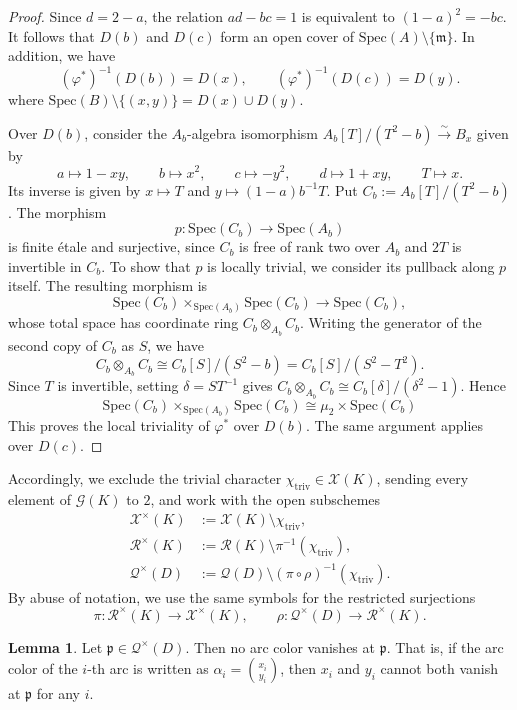 \documentclass[12pt,reqno]{amsart}
\newcommand{\calQ}{\mathcal{Q}}
\newcommand{\calX}{\mathcal{X}}
\newcommand{\calG}{\mathcal{G}}
\newcommand{\calR}{\mathcal{R}}
\newcommand{\Spec}{\mathrm{Spec}}
\theoremstyle{definition}
\newtheorem{lemma}[theorem]{Lemma}
\begin{document}
	\begin{proof}
		Since $d=2-a$, the relation $ad-bc=1$ is equivalent to $(1-a)^2=-bc$.
		It follows that $D(b)$ and $D(c)$ form an open cover of $\mathrm{Spec}(A)\setminus \{ \mathfrak{m}\}$. In addition, we have
		\[
    		(\varphi^\ast)^{-1}(D(b))=D(x),	\qquad 	(\varphi^\ast)^{-1}(D(c))=D(y).
		\]
		where $\mathrm{Spec}(B)\setminus\{(x,y)\} = D(x)\cup D(y)$.
	
		Over $D(b)$, consider the $A_b$-algebra isomorphism
		$A_b[T]/(T^2-b) \xrightarrow{\sim}	B_x$
		given by
		\[
		a\mapsto 1-xy,\qquad
		b\mapsto x^2,\qquad
		c\mapsto -y^2,\qquad
		d\mapsto 1+xy,\qquad
		T\mapsto x.
		\]
		Its inverse is given by $x \mapsto T$ and $y \mapsto (1-a)b^{-1}T$. Put $C_b:=A_b[T]/(T^2-b)$.
		The morphism
		\[
		      p: \Spec(C_b)\longrightarrow\Spec(A_b)
		\]
		is finite \'{e}tale and surjective, since $C_b$ is free of rank two over $A_b$ and $2T$ is invertible in $C_b$. To show that $p$ is locally trivial, we consider its pullback along $p$ itself. The resulting morphism is
		\[
		      \Spec(C_b)\times_{\Spec(A_b)}\Spec(C_b) \longrightarrow \Spec(C_b),
		\]
		whose total space has coordinate ring $C_b\otimes_{A_b}C_b$. Writing the generator of the second copy of $C_b$ as $S$, we have
		\[
		      C_b\otimes_{A_b}C_b \cong C_b[S]/(S^2-b) = C_b[S]/(S^2-T^2).
		\]
		Since $T$ is invertible, setting $\delta = ST^{-1}$ gives $C_b\otimes_{A_b}C_b \cong C_b[\delta]/(\delta^2-1)$.
		Hence
		\[
		      \Spec(C_b)\times_{\Spec(A_b)}\Spec(C_b) \cong \mu_2\times\Spec(C_b)
		\]
		This proves the local triviality of $\varphi^\ast$ over $D(b)$. The same argument applies over $D(c)$. 
	\end{proof}
	
	Accordingly, we exclude the trivial character $\chi_{\mathrm{triv}} \in \calX(K)$, sending every element of $\calG(K)$ to $2$, and work with the open subschemes
	\begin{align*}
		\calX^\times(K)	&:=	\calX(K)\setminus{\chi_{\mathrm{triv}}}, \\
		\calR^\times(K)	&:=	\calR(K)\setminus \pi^{-1}(\chi_{\mathrm{triv}}), \\
		\calQ^\times(D)	&:=	\calQ(D)\setminus (\pi\circ\rho)^{-1}(\chi_{\mathrm{triv}}).
	\end{align*}
	By abuse of notation, we use the same symbols for the restricted surjections
	$$
	\pi\colon\calR^\times(K)\longrightarrow\calX^\times(K), \qquad
	\rho\colon\calQ^\times(D)\longrightarrow\calR^\times(K).
	$$
	\begin{lemma} \label{lem:zerocol}Let $\mathfrak p\in\calQ^\times(D)$. Then no arc color vanishes at $\mathfrak p$. That is, if the arc color of the $i$-th arc is written as $\alpha_i=\binom{x_i}{y_i}$, then $x_i$ and $y_i$ cannot both vanish at $\mathfrak p$ for any $i$.
	\end{lemma}
	
\end{document}
